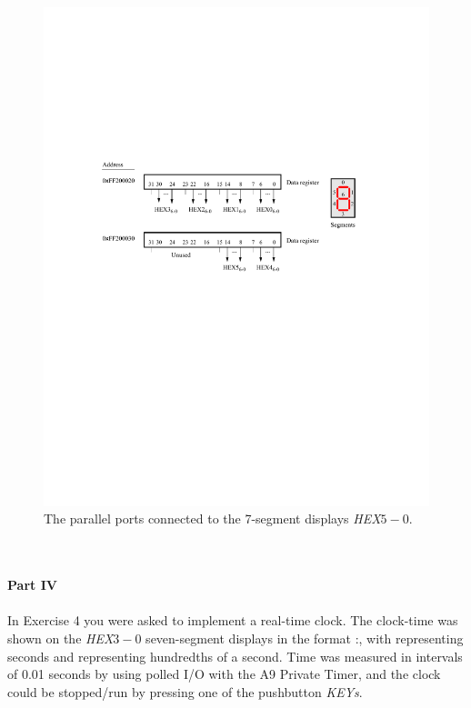 \documentclass[epsfig,10pt,fullpage]{article}
\begin{document}
\begin{figure}[H]
	\begin{center}
	\includegraphics[scale=1]{figures/figureHEX.pdf}
	\end{center}
	\caption{The parallel ports connected to the 7-segment displays {\it HEX}$5-0$.}
\label{fig:HEX}
\end{figure}

~\\
~\\
\noindent
{\bf Part IV}
~\\
~\\
\noindent
In Exercise 4 you were asked to implement a real-time clock. The
clock-time was shown on the {\it HEX}$3-0$ seven-segment displays in the format :,
with  representing seconds and  representing hundredths of a second.
Time was measured in intervals of 0.01 seconds by using polled I/O with the A9 Private Timer, 
and the clock could be stopped/run by pressing one of the pushbutton {\it KEYs}.
\end{document}
